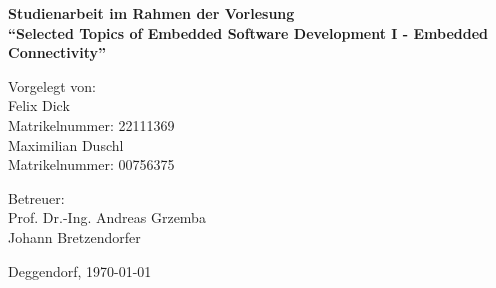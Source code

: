 \documentclass[12pt, a4paper]{article}
\begin{document}

\begin{titlepage}
    \centering
    
    
    \vspace{2cm}
    
    {\Huge\bfseries Studienarbeit im Rahmen der Vorlesung \\
    \enquote{Selected Topics of Embedded Software Development I - Embedded Connectivity}\par}
    
    \vspace{1cm}
        
    \vspace{2cm}
    
    {\large
    Vorgelegt von: \\
    \vspace{0.2cm}
    Felix Dick \\ 
    Matrikelnummer: 22111369\\ 
    Maximilian Duschl \\ 
    Matrikelnummer: 00756375\\
    \vspace{1.5cm}
    
    Betreuer: \\
    Prof. Dr.-Ing. Andreas Grzemba\\
    Johann Bretzendorfer\par} %
    
    \vfill %
    
    {\large Deggendorf, \today\par}

\end{titlepage}



\thispagestyle{empty}

\newpage

\tableofcontents
\newpage

\end{document}
